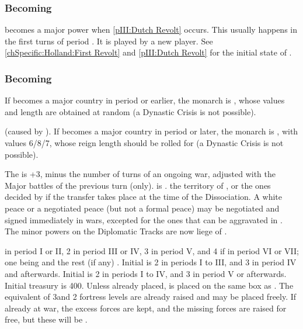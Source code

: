 \subsubsection{Becoming \paysmajeurHollande}
\aparag \HOL becomes a major power when \ref{pIII:Dutch Revolt} occurs. This
usually happens in the first turns of period .
\bparag It is played by a new player. 
\aparag See \ref{chSpecific:Holland:First Revolt} and \ref{pIII:Dutch Revolt}
for the initial state of \paysmajeurHollande.


\subsubsection{Becoming \paysmajeurAutriche}
 If \AUS becomes a major country in period
 or earlier, %
the monarch is , whose values and length are obtained
at random (a Dynastic Crisis is not possible).

 (caused by ). %
If \AUS becomes a major country in period  or later, the monarch is
, with values 6/8/7, whose reign length should be
rolled for (a Dynastic Crisis is not possible).

\bparag The \STAB is +3, minus the number of turns of an ongoing war, adjusted
with the Major battles of the previous turn (only).
\bparag \HAB is .
 the territory of \payshabsbourg, or the ones decided
by  if the transfer takes place at the time of the
Dissociation.
\aparag[Diplomacy] A white peace or a negotiated peace (but not a formal
peace) may be negotiated and signed immediately in wars, excepted for the ones
that can be aggravated in .
\bparag The minor powers on the Diplomatic Tracks are now liege of \AUS.

 \MNU in period I or II, 2 \MNU in period III or IV, 3 \MNU in period
V, and 4 if in period VI or VII; one being \facemoins and the rest (if any)
\faceplus. Initial \DTI is 2 in periods I to III, and 3 in period IV and
afterwards.  Initial \FTI is 2 in periods I to IV, and 3 in period V or
afterwards.
\bparag Initial treasury is 400\ducats.
\aparag[military]
\bparag Unless already placed,  is placed on the same
box as \SPA.
\bparag The equivalent of 3\ARMY\faceplus and 2 fortress levels are already
raised and may be placed freely. If already at war, the excess forces are
kept, and the missing forces are raised for free, but these will be
.


